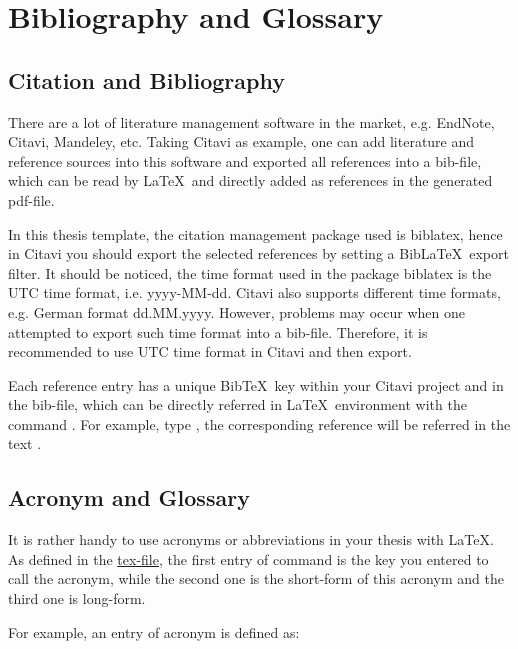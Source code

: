 \chapter{Bibliography and Glossary}

\graphicspath{ {graphics/Chapter5/} }

\section{Citation and Bibliography}

	There are a lot of literature management software in the market, e.g. EndNote, Citavi, Mandeley, etc. Taking Citavi as example, one can add literature and reference sources into this software and exported all references into a bib-file, which can be read by \LaTeX~and directly added as references in the generated pdf-file.
	
	In this thesis template, the citation management package used is {\color{blue}biblatex}, hence in Citavi you should export the selected references by setting a Bib\LaTeX~export filter. It should be noticed, the time format used in the package {\color{blue}biblatex} is the \gls{UTC} time format, i.e. \colorbox{yellow!60}{yyyy-MM-dd}. Citavi also supports different time formats, e.g. German format \colorbox{yellow!60}{dd.MM.yyyy}. However, problems may occur when one attempted to export such time format into a bib-file. Therefore, it is recommended to use \acrshort{UTC} time format in Citavi and then export.
	
	Each reference entry has a unique Bib\TeX~key within your Citavi project and in the bib-file, which can be directly referred in \LaTeX~environment with the command {\color{blue}{\verb|\cite|}}. For example, type {}, the corresponding reference will be referred in the text \cite{Burger.20180508}.


\section{Acronym and Glossary}

	It is rather handy to use acronyms or abbreviations in your thesis with \LaTeX. As defined in the \href{acronyms/acronyms.tex}{tex-file}, the first entry of {\color{blue}{\verb|\newacronym|}} command is the key you entered to call the acronym, while the second one is the short-form of this acronym and the third one is long-form.
	
	For example, an entry of acronym is defined as:
	
